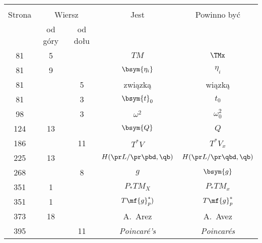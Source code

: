 \documentclass[a4paper,11pt]{article}
\begin{document}
\begin{center}
  \begin{tabular}{|c|c|c|c|c|}
    \hline
    & \multicolumn{2}{c|}{} & & \\
    Strona & \multicolumn{2}{c|}{Wiersz} & Jest
                              & Powinno być \\ \cline{2-3}
    & od góry & od dołu & & \\
    \hline
    81  &  5 & & $TM$ & $\TMx$ \\
    81  &  9 & & $\bsym{ \eta_{ i } }$ & $\eta_{ i }$ \\
    81  & &  5 & związką & wiązką \\
    81  & &  3 & $\bsym{t}_{ 0 }$ & $t_{ 0 }$ \\
    98  & &  3 & $\omega^{ 2 }$ & $\omega_{ 0 }^{ 2 }$ \\
    124 & 13 & & $\bsym{Q}$ & $Q$ \\
    186 & & 11 & $T^{ * }V$ & $T^{ * }V_{ x }$ \\
    225 & 13 & & $H( \pr L / \pr \pbd, \qb )$
           & $H( \pr L / \pr \qbd, \qb )$ \\
    268 & &  8 & $g$ & $\bsym{g}$ \\
    351 &  1 & & $P_{ * }TM_{ X }$ & $P_{ * }TM_{ x }$ \\
    351 &  1 & & $T\mf{g}_{ p }^{ * })$ & $T\mf{g}_{ p }^{ * }$ \\
    373 & 18 & & A.~Arez & A.~Avez \\
    395 & & 11 & \emph{Poincar\'{e}'s} & \emph{Poincar\'{e}s} \\
    \hline
  \end{tabular}
\end{center}

\vspace{\spaceTwo}





\end{document}
